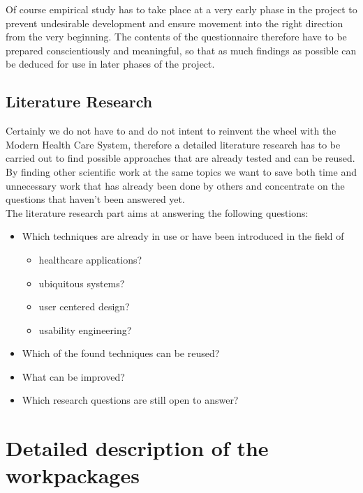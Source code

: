 \documentclass[a4paper,11pt]{article}
\begin{document}
Of course empirical study has to take place at a very early phase in the project to prevent undesirable development and ensure movement into the right direction from the very beginning. The contents of the questionnaire therefore have to be prepared conscientiously and meaningful, so that as much findings as possible can be deduced for use in later phases of the project.

\subsection{Literature Research}

Certainly we do not have to and do not intent to reinvent the wheel with the Modern Health Care System, therefore a detailed literature research has to be carried out to find possible approaches that are already tested and can be reused. By finding other scientific work at the same topics we want to save both time and unnecessary work that has already been done by others and concentrate on the questions that haven't been answered yet. \\

The literature research part aims at answering the following questions:

\begin{itemize}
\item Which techniques are already in use or have been introduced in the field of
\begin{itemize}
\item healthcare applications?
\item ubiquitous systems?
\item user centered design?
\item usability engineering?
\end{itemize} 
\item Which of the found techniques can be reused?
\item What can be improved?
\item Which research questions are still open to answer?
\end{itemize}

\newpage
\section{Detailed description of the workpackages}
\label{sect:workplan}
\end{document}
